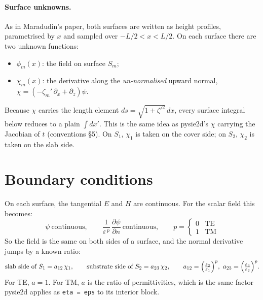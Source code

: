 \documentclass[11pt,a4paper]{article}
\begin{document}
\paragraph{Surface unknowns.} As in Maradudin's paper, both surfaces are written as
height profiles, parametrised by $x$ and sampled over $-L/2<x<L/2$. On each surface there are two unknown functions:
\begin{itemize}
  \item $\phi_m(x)$: the field on surface $S_m$;
  \item $\chi_m(x)$: the derivative along the \emph{un-normalised} upward normal,
        $\chi = \left(-\zeta_m'\,\partial_x + \partial_z\right)\psi$.
\end{itemize}
Because $\chi$ carries the length element $ds = \sqrt{1+\zeta'^2}\,dx$, every surface integral below reduces to a plain $\int dx'$.
This is the same idea as pysie2d's $\chi$ carrying the Jacobian of $t$ (conventions \S5).
On $S_1$, $\chi_1$ is taken on the cover side; on $S_2$, $\chi_2$ is taken on the slab side.

\section{Boundary conditions}

On each surface, the tangential $E$ and $H$ are continuous. For the scalar field this becomes:
\begin{equation}
  \psi \ \text{continuous}, \qquad
  \frac{1}{\varepsilon^{\,p}}\,\frac{\partial\psi}{\partial n}\ \text{continuous},
  \qquad p = \begin{cases}0 & \text{TE}\\ 1 & \text{TM}\end{cases}
\end{equation}
So the field is the same on both sides of a surface, and the normal derivative
jumps by a known ratio:
\begin{equation}
  \text{slab side of } S_1 = a_{12}\,\chi_1,\qquad
  \text{substrate side of } S_2 = a_{23}\,\chi_2,\qquad
  a_{12} = \Bigl(\tfrac{\varepsilon_2}{\varepsilon_1}\Bigr)^{p},\
  a_{23} = \Bigl(\tfrac{\varepsilon_3}{\varepsilon_2}\Bigr)^{p}.
\end{equation}
For TE, $a=1$. For TM, $a$ is the ratio of permittivities, which is the same
factor pysie2d applies as \texttt{eta = eps} to its interior block.

\end{document}
